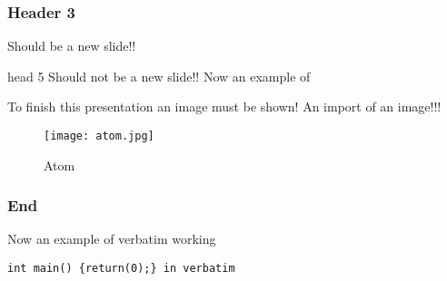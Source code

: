 \documentclass{beamer}
\begin{document}
\begin{frame}
	\frametitle{Header 3}
Should be a new slide!!

head 5
Should not be a new slide!!
Now an example of 

To finish this presentation an image must be shown!
An import of an image!!!

\begin{figure}[!ht]
	 \centering
	 \texttt{[image: atom.jpg]} 
	 \caption{Atom}
 \end{figure}
\end{frame}

\begin{frame}
	\frametitle{End}
Now an example of verbatim working 

\end{frame}
\begin{frame}[fragile]
\begin{verbatim}
int main() {return(0);} in verbatim
\end{verbatim}
\end{frame}
\end{document}
